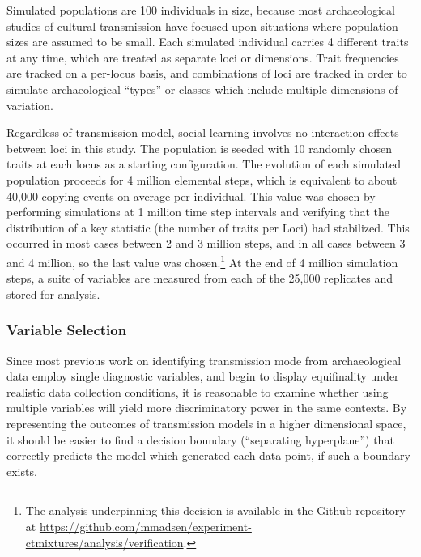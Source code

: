 \documentclass[10pt,letterpaper]{article}
\begin{document}
Simulated populations are 100 individuals in size, because most
archaeological studies of cultural transmission have focused upon
situations where population sizes are assumed to be small. 
Each simulated individual carries 4 different
traits at any time, which are treated as separate loci or dimensions.  Trait frequencies are tracked on a per-locus basis, and combinations of loci are tracked in order to simulate archaeological ``types'' or classes which include multiple dimensions of variation.

Regardless of transmission model, social learning involves no interaction effects between loci in this study. The
population is seeded with 10 randomly chosen traits at each locus as a
starting configuration. The evolution of each simulated population proceeds
for 4 million elemental steps, which is equivalent to about 40,000
copying events on average per individual. This value was chosen by
performing simulations at 1 million time step intervals and verifying
that the distribution of a key statistic (the number of traits per Loci)
had stabilized. This occurred in most cases between 2 and 3 million
steps, and in all cases between 3 and 4 million, so the last value
was chosen.\footnote{The analysis underpinning this decision is available in the Github repository at \url{https://github.com/mmadsen/experiment-ctmixtures/analysis/verification}.}
At the end of 4 million simulation steps, a suite of variables are
measured from each of the 25,000 replicates and stored for analysis.

\subsubsection{Variable Selection}\label{variable-selection}

Since most previous work on identifying transmission mode from archaeological data employ single diagnostic variables, and begin to display equifinality under realistic data collection conditions, it is reasonable to examine whether using multiple variables will yield more discriminatory power in the same contexts.  By representing the outcomes of transmission models in a higher dimensional space, it should be easier to find a decision boundary (``separating hyperplane'') that correctly predicts the model which generated each data point, if such a boundary exists.  
\end{document}

